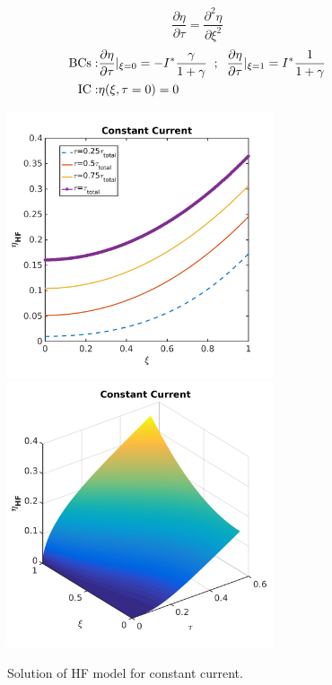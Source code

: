 \documentclass[]{article}
\begin{document}
\begin{equation*}
\frac{\partial\eta}{\partial\tau} = \frac{\partial^2\eta}{\partial\xi^2}
\end{equation*}
%
\begin{eqnarray}
{\rm BCs:} & \frac{\partial\eta}{\partial\tau}|_{\xi=0} = -I^* \frac{\gamma}{1+\gamma} \;\; ; \;\;
\frac{\partial\eta}{\partial\tau}|_{\xi=1} = I^* \frac{1}{1+\gamma}\\
{\rm IC:} & \eta(\xi,\tau=0)=0
\end{eqnarray}
%
\begin{figure}[h]
    \centering
    \includegraphics[trim = 0in 0in 0in 0in, clip, width=0.7\textwidth]{figures/etaHF2d.png}
    \\
    \includegraphics[trim = 0in 0in 0in 0in, clip, width=0.7\textwidth]{figures/etaHF3d.png}      
    \caption{Solution of HF model for constant current.}
    \label{fig:etaHF}
\end{figure}
\end{document}
